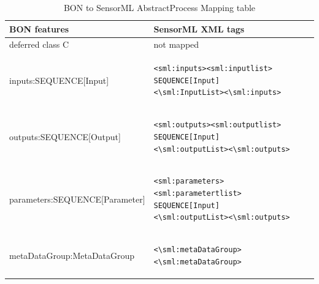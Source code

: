 \documentclass[]{final_report}
\begin{document}
\begin{table}[!th]
\centering
\begin{tabular}{|l|l|}
\hline
BON features & SensorML XML tags\\
\hline
   deferred class C  & not mapped\\
\hline     
     inputs:SEQUENCE[Input] & \begin{lstlisting}
<sml:inputs><sml:inputlist>
SEQUENCE[Input]
<\sml:InputList><\sml:inputs>\end{lstlisting}\\

\hline 
     outputs:SEQUENCE[Output] & \begin{lstlisting}
<sml:outputs><sml:outputlist>
SEQUENCE[Input]
<\sml:outputList><\sml:outputs>\end{lstlisting}\\
\hline
     parameters:SEQUENCE[Parameter] & \begin{lstlisting}
<sml:parameters><sml:parametertlist>
SEQUENCE[Input]
<\sml:outputList><\sml:outputs>\end{lstlisting}\\

\hline                 
     metaDataGroup:MetaDataGroup &  \begin{lstlisting}
<\sml:metaDataGroup><\sml:metaDataGroup>\end{lstlisting}\\
 \hline    

\end{tabular}
\caption{BON to SensorML AbstractProcess Mapping table}\label{table:bon_sml_example}
\label{ex:table}
\end{table}
\end{document}
